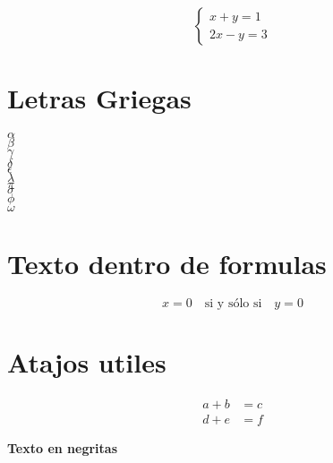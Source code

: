 \documentclass{article} %
\begin{document}
\[
\begin{cases}
x + y = 1 \\
2x - y = 3
\end{cases}
\]

\section{Letras Griegas}
$\alpha$\\
$\beta$\\
$\gamma$\\
$\delta$\\
$\epsilon$\\
$\lambda$\\
$\pi$\\
$\sigma$\\
$\phi$\\
$\omega$\\

\section{Texto dentro de formulas}
\[
x = 0 \quad \text{si y sólo si} \quad y = 0
\]

\section{Atajos utiles}
\begin{align*}
a + b &= c \\
d + e &= f
\end{align*}

\textbf{Texto en negritas}
\end{document}
